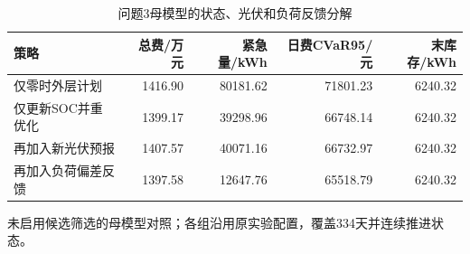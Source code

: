 \begin{table}[htbp]\centering\small
\caption{问题3母模型的状态、光伏和负荷反馈分解}
\label{tab:v2_feedback}
\begin{tabularx}{\linewidth}{LRRRR}\toprule
策略 & 总费/万元 & 紧急量/kWh & 日费CVaR95/元 & 末库存/kWh\\\midrule
仅零时外层计划 & 1416.90 & 80181.62 & 71801.23 & 6240.32\\
仅更新SOC并重优化 & 1399.17 & 39298.96 & 66748.14 & 6240.32\\
再加入新光伏预报 & 1407.57 & 40071.16 & 66732.97 & 6240.32\\
再加入负荷偏差反馈 & 1397.58 & 12647.76 & 65518.79 & 6240.32\\
\bottomrule\end{tabularx}
\par\smallskip\parbox{\linewidth}{\footnotesize 未启用候选筛选的母模型对照；各组沿用原实验配置，覆盖334天并连续推进状态。}
\end{table}
